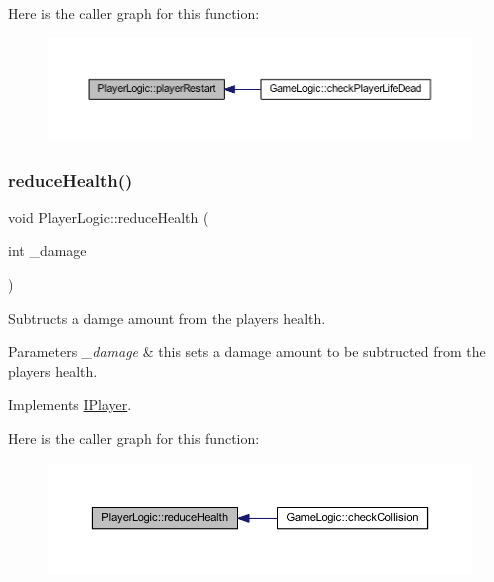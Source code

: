 Here is the caller graph for this function\+:\nopagebreak
\begin{figure}[H]
\begin{center}
\leavevmode
\includegraphics[width=350pt]{class_player_logic_aaaf0e8356e5af9753015960be7727724_icgraph}
\end{center}
\end{figure}
\mbox{\label{class_player_logic_a43c4cfcdfd439ff3ef8015c2170f9381}} 
\subsubsection{\texorpdfstring{reduce\+Health()}{reduceHealth()}}
{\footnotesize\ttfamily void Player\+Logic\+::reduce\+Health (\begin{DoxyParamCaption}\item[{int}]{\+\_\+damage }\end{DoxyParamCaption})\hspace{0.3cm}{\ttfamily [virtual]}}



Subtructs a damge amount from the players health. 


\begin{DoxyParams}{Parameters}
{\em \+\_\+damage} & this sets a damage amount to be subtructed from the players health. \\
\hline
\end{DoxyParams}


Implements \hyperlink{class_i_player_a27eab471444f8ae2cf96bee562488b70}{I\+Player}.

Here is the caller graph for this function\+:\nopagebreak
\begin{figure}[H]
\begin{center}
\leavevmode
\includegraphics[width=350pt]{class_player_logic_a43c4cfcdfd439ff3ef8015c2170f9381_icgraph}
\end{center}
\end{figure}
\mbox{\label{class_player_logic_a3139e107a0eb76e7307f8657818b3007}} 
